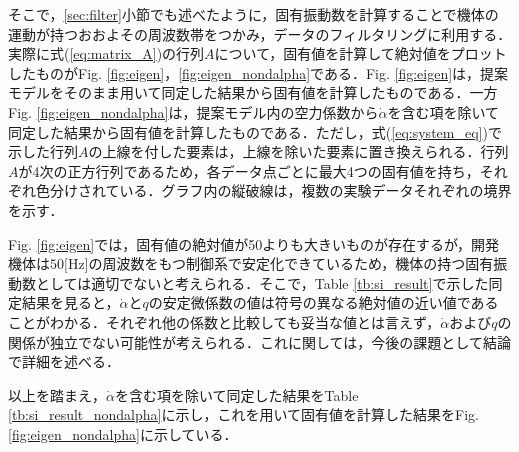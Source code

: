 

そこで，\ref{sec:filter}小節でも述べたように，固有振動数を計算することで機体の運動が持つおおよその周波数帯をつかみ，データのフィルタリングに利用する．実際に式(\ref{eq:matrix_A})の行列$A$について，固有値を計算して絶対値をプロットしたものがFig. \ref{fig:eigen}，\ref{fig:eigen_nondalpha}である．Fig. \ref{fig:eigen}は，提案モデルをそのまま用いて同定した結果から固有値を計算したものである．一方Fig. \ref{fig:eigen_nondalpha}は，提案モデル内の空力係数から$\dot{\alpha}$を含む項を除いて同定した結果から固有値を計算したものである．ただし，式(\ref{eq:system_eq})で示した行列$A$の上線を付した要素は，上線を除いた要素に置き換えられる．行列$A$が4次の正方行列であるため，各データ点ごとに最大4つの固有値を持ち，それぞれ色分けされている．グラフ内の縦破線は，複数の実験データそれぞれの境界を示す．

Fig. \ref{fig:eigen}では，固有値の絶対値が50よりも大きいものが存在するが，開発機体は$50\mbox{[Hz]}$の周波数をもつ制御系で安定化できているため，機体の持つ固有振動数としては適切でないと考えられる．そこで，Table \ref{tb:si_result}で示した同定結果を見ると，$\dot{\alpha}$と$q$の安定微係数の値は符号の異なる絶対値の近い値であることがわかる．それぞれ他の係数と比較しても妥当な値とは言えず，$\dot{\alpha}$および$q$の関係が独立でない可能性が考えられる．これに関しては，今後の課題として結論で詳細を述べる．

以上を踏まえ，$\dot{\alpha}$を含む項を除いて同定した結果をTable \ref{tb:si_result_nondalpha}に示し，これを用いて固有値を計算した結果をFig. \ref{fig:eigen_nondalpha}に示している．

